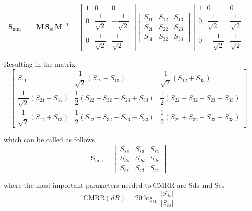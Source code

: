 \begin{align}
\mathbf{S}_{\mathrm{mm}}
&= \mathbf{M}\,\mathbf{S}_{\mathrm{se}}\,\mathbf{M}^{-1}=
\begin{bmatrix}
1 & 0 & 0 \\
0 & \dfrac{1}{\sqrt{2}} & -\dfrac{1}{\sqrt{2}} \\
0 & \dfrac{1}{\sqrt{2}} & \dfrac{1}{\sqrt{2}}
\end{bmatrix}
\begin{bmatrix}
S_{11} & S_{12} & S_{13} \\
S_{21} & S_{22} & S_{23} \\
S_{31} & S_{32} & S_{33}
\end{bmatrix}
\begin{bmatrix}
1 & 0 & 0 \\
0 & \dfrac{1}{\sqrt{2}} & \dfrac{1}{\sqrt{2}} \\
0 & -\dfrac{1}{\sqrt{2}} & \dfrac{1}{\sqrt{2}}
\end{bmatrix}
\end{align}

Resulting in the matrix: 
\begin{equation}
    \begin{bmatrix}
S_{11} & \dfrac{1}{\sqrt{2}}(S_{12}-S_{13}) & \dfrac{1}{\sqrt{2}}(S_{12}+S_{13}) \\[1pt]
\dfrac{1}{\sqrt{2}}(S_{21}-S_{31}) & \dfrac{1}{2}(S_{22}-S_{32}-S_{23}+S_{33}) &\dfrac{1}{2}(S_{22}-S_{32}+S_{23}-S_{33}) \\[7pt]
\dfrac{1}{\sqrt{2}}(S_{12}+S_{13}) & \dfrac{1}{2}(S_{22}+S_{32}-S_{23}-S_{33}) & \dfrac{1}{2}(S_{22}+S_{32}+S_{23}+S_{33})
\end{bmatrix}
\label{eq:Mixed}
\end{equation}

which can be called as follows
\begin{equation}
    \mathbf{S}_{\mathrm{mm}} =
\begin{bmatrix}
S_{ss} & S_{sd} & S_{sc} \\
S_{ds} & S_{dd} & S_{dc} \\
S_{cs} & S_{cd} & S_{cc}
\end{bmatrix}
\end{equation}

where the most important parameters needed to CMRR are Sds and Scs
\begin{equation}
    \text{CMRR}(dB)=20\log_{10}{\dfrac{|S_{ds}|}{|S_{cs}|}}
    \label{eq:CMRR}
\end{equation}

